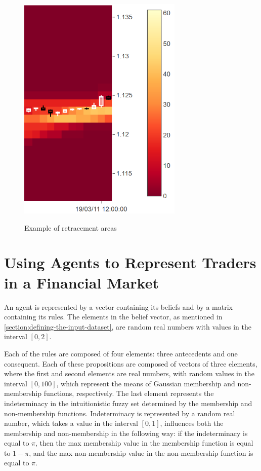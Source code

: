 \begin{figure}
\caption{Example of retracement areas} \centering
\includegraphics[width=0.7\textwidth]{img/retracement-areas.png}
\label{figure:example-of-retracement-areas}
\end{figure}

\section{Using Agents to Represent Traders in a Financial Market}
\label{section:using-agents-to-represent-traders-in-a-financial-market:implementation}

An agent is represented by a vector containing its beliefs and by a matrix
containing its rules. The elements in the belief vector, as mentioned in
\ref{section:defining-the-input-dataset}, are random real numbers with values in
the interval $[0, 2]$. %

Each of the rules are composed of four elements: three antecedents and one
consequent. Each of these propositions are composed of vectors of three
elements, where the first and second elements are real numbers, with random
values in the interval $[0, 100]$, which represent the means of Gaussian
membership and non-membership functions, respectively. The last element
represents the indeterminacy in the intuitionistic fuzzy set determined by the
membership and non-membership functions. Indeterminacy is represented by a
random real number, which takes a value in the interval $[0, 1]$, influences
both the membership and non-membership in the following way: if the
indeterminacy is equal to $\pi$, then the max membership value in the membership
function is equal to $1 - \pi$, and the max non-membership value in the
non-membership function is equal to $\pi$.

